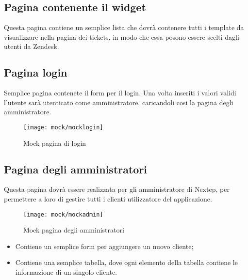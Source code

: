 \subsection{Pagina contenente il widget} Questa pagina contiene un semplice lista che dovrà contenere tutti i template da visualizzare nella pagina dei tickets, in modo che essa posono essere scelti dagli utenti da Zendesk.
\\ 
\subsection{Pagina login}
Semplice pagina contenete il form per il login. Una volta inseriti i valori validi l'utente sarà utenticato come amministratore, caricandoli cosi la pagina degli amministratore. 
\begin{figure}[!h] 
	\centering 
	\texttt{[image: mock/mocklogin]} 
	\caption{Mock pagina di login}
\end{figure}  \newpage
\subsection{Pagina degli amministratori}
Questa pagina dovrà essere realizzata per gli amministratore di Nextep, per permettere a loro di gestire tutti i clienti utilizzatore del applicazione. 
\begin{figure}[!h] 
	\centering 
	\texttt{[image: mock/mockadmin]} 
	\caption{Mock pagina degli amministratori}
\end{figure} 
\newpage 
\begin{itemize}
	\item Contiene un semplice form per aggiungere un nuovo cliente;
	\item Contiene una semplice tabella, dove ogni elemento della tabella contiene le informazione di un singolo cliente.
\end{itemize}
